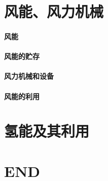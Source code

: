 \documentclass[UTF8]{../../ApplicationUniverse}
\begin{document}
\chapter{风能、风力机械}
\subsubsection{风能}
\subsubsection{风能的贮存}
\subsubsection{风力机械和设备}
\subsubsection{风能的利用}






\chapter{氢能及其利用}



\chapter{END}
\end{document}
